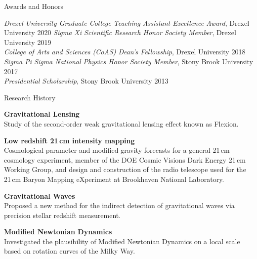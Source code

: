 \documentclass{resume} %
\begin{document}

\begin{rSection}{Awards and Honors}

\textit{Drexel University Graduate College Teaching Assistant Excellence Award}, Drexel University \hfill{2020}
\textit{Sigma Xi Scientific Research Honor Society Member}, Drexel University \hfill{2019}\\
\textit{College of Arts and Sciences (CoAS) Dean's Fellowship}, Drexel University \hfill {2018}\\
\textit{Sigma Pi Sigma National Physics Honor Society Member}, Stony Brook University \hfill{2017}\\
\textit{Presidential Scholarship}, Stony Brook University \hfill {2013}\\

\end{rSection}


\begin{rSection}{Research History}

\begin{description}[leftmargin=8em, style=nextline]

\item[\textnormal{2018 -- Present}] \textbf{Gravitational Lensing}\\
Study of the second-order weak gravitational lensing effect known as Flexion. 
\item[\textnormal{2015 -- Present}] \textbf{Low redshift 21$\,$cm intensity mapping}\\
 Cosmological parameter and modified gravity forecasts for a general 21$\,$cm cosmology 
 experiment, member of the DOE Cosmic Visions Dark Energy 21$\,$cm Working Group, and design and construction
 of the radio telescope used for the 21$\,$cm Baryon Mapping eXperiment at Brookhaven National
 Laboratory.
\item[\textnormal{2013}] \textbf{Gravitational Waves}\\
 Proposed a new method for the indirect detection of gravitational waves via precision 
 stellar redshift measurement.
\item[\textnormal{2012}] \textbf{Modified Newtonian Dynamics}\\
 Investigated the plausibility of Modified Newtonian Dynamics on a local scale based on
 rotation curves of the Milky Way.

\end{description}

\end{rSection}
\end{document}
